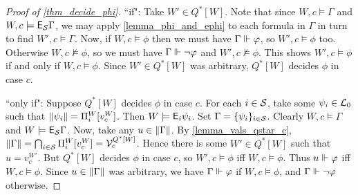\begin{proof}[Proof of \cref{thm_decide_phi}]
    ``if": Take $W' \in Q^*[W]$. Note that since $W, c \models \Gamma$ and $W,
    c \models \mathsf{E}_{\mathcal{S}}\Gamma$, we may apply \cref{lemma_phi_and_ephi} to each
    formula in $\Gamma$ in turn to find $W', c \models \Gamma$. Now, if $W, c
    \models \phi$ then we must have $\Gamma \Vdash \varphi$, so $W', c
    \models \phi$ too. Otherwise $W, c \not\models \phi$, so we must have
    $\Gamma \Vdash \neg\varphi$ and $W', c \not\models \phi$. This shows $W',
    c \models \phi$ if and only if $W, c \models \phi$. Since $W' \in Q^*[W]$
    was arbitrary, $Q^*[W]$ decides $\phi$ in case $c$.

    ``only if": Suppose $Q^*[W]$ decides $\phi$ in case $c$. For each $i \in
    \mathcal{S}$, take some $\psi_i \in \mathcal{L}_0$ such that $\|{\psi_i}\| =
    \Pi^W_i[v^W_c]$. Then $W \models \mathsf{E}_i\psi_i$. Set $\Gamma = \{\psi_i\}_{i
    \in \mathcal{S}}$. Clearly $W, c \models \Gamma$ and $W \models \mathsf{E}_{\mathcal{S}}\Gamma$.
    Now, take any $u \in \|{\Gamma}\|$. By \cref{lemma_vals_qstar_c},
    $\|{\Gamma}\| = \bigcap_{i \in \mathcal{S}}{\Pi^W_i[v^W_c]} =
    \mathcal{V}^{Q^*[W]}_c$. Hence there is some $W' \in Q^*[W]$ such that $u =
    v^{W'}_c$. But $Q^*[W]$ decides $\phi$ in case $c$, so $W', c \models \phi$
    iff $W, c \models \phi$. Thus $u \Vdash \varphi$ iff $W, c \models \phi$.
    Since $u \in \|{\Gamma}\|$ was arbitrary, we have $\Gamma \Vdash
    \varphi$ if $W, c \models \phi$, and $\Gamma \Vdash \neg\varphi$ otherwise.
\end{proof}

